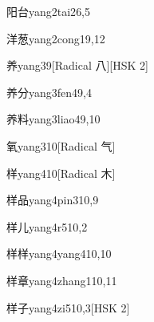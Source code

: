 \begin{entry}{阳台}{yang2tai2}{6,5}
\end{entry}

\begin{entry}{洋葱}{yang2cong1}{9,12}
\end{entry}

\begin{entry}{养}{yang3}{9}[Radical 八][HSK 2]
\end{entry}

\begin{entry}{养分}{yang3fen4}{9,4}
\end{entry}

\begin{entry}{养料}{yang3liao4}{9,10}
\end{entry}

\begin{entry}{氧}{yang3}{10}[Radical 气]
\end{entry}

\begin{entry}{样}{yang4}{10}[Radical 木]
\end{entry}

\begin{entry}{样品}{yang4pin3}{10,9}
\end{entry}

\begin{entry}{样儿}{yang4r5}{10,2}
\end{entry}

\begin{entry}{样样}{yang4yang4}{10,10}
\end{entry}

\begin{entry}{样章}{yang4zhang1}{10,11}
\end{entry}

\begin{entry}{样子}{yang4zi5}{10,3}[HSK 2]
\end{entry}

